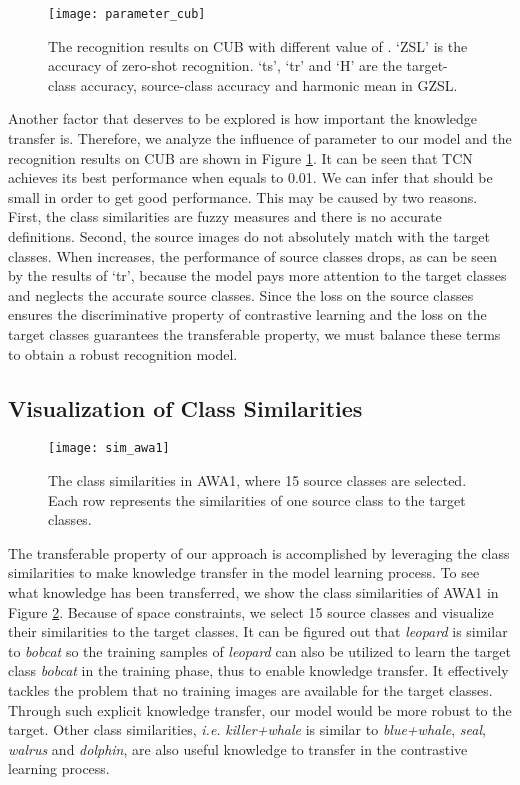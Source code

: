 \documentclass[10pt,twocolumn,letterpaper]{article}
\begin{document}
\begin{figure}[t]
\centering
\texttt{[image: parameter\_cub]}
\caption{The recognition results on CUB with different value of . `ZSL' is the accuracy of zero-shot recognition. `ts', `tr' and `H' are the target-class accuracy, source-class accuracy and harmonic mean in GZSL. }
\label{fig:parameter}
\end{figure}

Another factor that deserves to be explored is how important the knowledge transfer is. Therefore, we analyze the influence of parameter  to our model and the recognition results on CUB are shown in Figure \ref{fig:parameter}. It can be seen that TCN achieves its best performance when  equals to 0.01. We can infer that  should be small in order to get good performance. This may be caused by two reasons. First, the class similarities are fuzzy measures and there is no accurate definitions. Second, the source images do not absolutely match with the target classes. When  increases, the performance of source classes drops, as can be seen by the results of `tr', because the model pays more attention to the target classes and neglects the accurate source classes. Since the loss on the source classes ensures the discriminative property of contrastive learning and the loss on the target classes guarantees the transferable property, we must balance these terms to obtain a robust recognition model.


\subsection{Visualization of Class Similarities}
\begin{figure}[t]
\centering
\texttt{[image: sim\_awa1]}
\caption{The class similarities in AWA1, where 15 source classes are selected. Each row represents the similarities of one source class to the target classes.}
\label{fig:sim_awa}
\end{figure}

The transferable property of our approach is accomplished by leveraging the class similarities to make knowledge transfer in the model learning process. To see what knowledge has been transferred, we show the class similarities of AWA1 in Figure \ref{fig:sim_awa}. Because of space constraints, we select 15 source classes and visualize their similarities to the target classes. It can be figured out that \emph{leopard} is similar to \emph{bobcat} so the training samples of \emph{leopard} can also be utilized to learn the target class \emph{bobcat} in the training phase, thus to enable knowledge transfer. It effectively tackles the problem that no training images are available for the target classes. Through such explicit knowledge transfer, our model would be more robust to the target. Other class similarities, \emph{i.e.} \emph{killer+whale} is similar to \emph{blue+whale}, \emph{seal}, \emph{walrus} and \emph{dolphin}, are also useful knowledge to transfer in the contrastive learning process.
\end{document}
